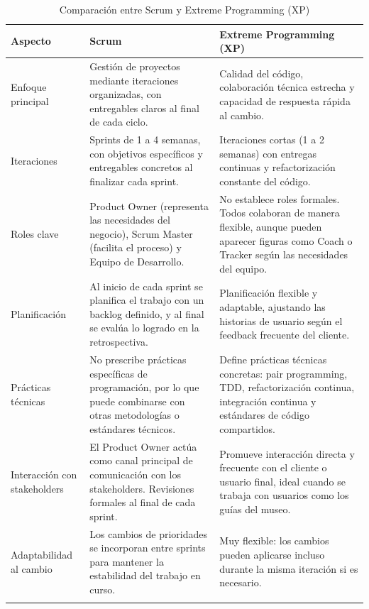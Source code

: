 \documentclass[pdflatex,sn-mathphys-num]{sn-jnl}%
\theoremstyle{thmstyleone}%
\theoremstyle{thmstyletwo}%
\theoremstyle{thmstylethree}%
\begin{document}
\begin{table}[h!]
\caption{Comparación entre Scrum y Extreme Programming (XP)}
\label{tab:scrum-xp}
\centering
\small
\begin{tabularx}{\linewidth}{@{} lXX @{}} 
\toprule
\textbf{Aspecto} & \textbf{Scrum} & \textbf{Extreme Programming (XP)} \\ 
\midrule

Enfoque principal & Gestión de proyectos mediante iteraciones organizadas, con entregables claros al final de cada ciclo. & Calidad del código, colaboración técnica estrecha y capacidad de respuesta rápida al cambio. \\ \addlinespace

Iteraciones & Sprints de 1 a 4 semanas, con objetivos específicos y entregables concretos al finalizar cada sprint. & Iteraciones cortas (1 a 2 semanas) con entregas continuas y refactorización constante del código. \\ \addlinespace

Roles clave & Product Owner (representa las necesidades del negocio), Scrum Master (facilita el proceso) y Equipo de Desarrollo. & No establece roles formales. Todos colaboran de manera flexible, aunque pueden aparecer figuras como Coach o Tracker según las necesidades del equipo. \\ \addlinespace

Planificación & Al inicio de cada sprint se planifica el trabajo con un backlog definido, y al final se evalúa lo logrado en la retrospectiva. & Planificación flexible y adaptable, ajustando las historias de usuario según el feedback frecuente del cliente. \\ \addlinespace

Prácticas técnicas & No prescribe prácticas específicas de programación, por lo que puede combinarse con otras metodologías o estándares técnicos. & Define prácticas técnicas concretas: pair programming, TDD, refactorización continua, integración continua y estándares de código compartidos. \\ \addlinespace

Interacción con stakeholders & El Product Owner actúa como canal principal de comunicación con los stakeholders. Revisiones formales al final de cada sprint. & Promueve interacción directa y frecuente con el cliente o usuario final, ideal cuando se trabaja con usuarios como los guías del museo. \\ \addlinespace

Adaptabilidad al cambio & Los cambios de prioridades se incorporan entre sprints para mantener la estabilidad del trabajo en curso. & Muy flexible: los cambios pueden aplicarse incluso durante la misma iteración si es necesario. \\ \addlinespace


\end{tabularx}
\end{table}
\end{document}
